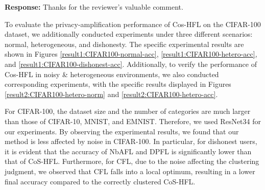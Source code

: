 \documentclass[a4paper,twoside,11pt,dvipsnames]{reviewresponse}
\begin{document}
\color{black}
\textbf{Response:} Thanks for the reviewer's valuable comment. 

To evaluate the privacy-amplification performance of Cos-HFL on the CIFAR-100 dataset, we additionally conducted experiments under three different scenarios: normal, heterogeneous, and dishonesty. The specific experimental results are shown in Figures \ref{result1:CIFAR100-normal-acc}, \ref{result1:CIFAR100-hetero-acc}, and \ref{result1:CIFAR100-dishonest-acc}. Additionally, to verify the performance of Cos-HFL in noisy \& heterogeneous environments, we also conducted corresponding experiments, with the specific results displayed in Figures \ref{result2:CIFAR100-hetero-norm} and \ref{result2:CIFAR100-hetero-acc}. 

For CIFAR-100, the dataset size and the number of categories are much larger than those of CIFAR-10, MNIST, and EMNIST. Therefore, we used ResNet34 for our experiments. By observing the experimental results, we found that our method is less affected by noise in CIFAR-100. In particular, for dishonest users, it is evident that the accuracy of NbAFL and DPFL is significantly lower than that of CoS-HFL. Furthermore, for CFL, due to the noise affecting the clustering judgment, we observed that CFL falls into a local optimum, resulting in a lower final accuracy compared to the correctly clustered CoS-HFL.
\end{document}
